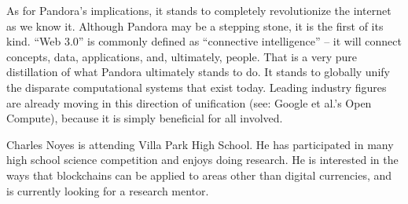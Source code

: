 \documentclass[journal]{IEEEtran}
\begin{document}
\par As for Pandora’s implications, it stands to completely revolutionize the internet as we know it. Although Pandora may be a stepping stone, it is the first of its kind. “Web 3.0” is commonly defined as “connective intelligence” – it will connect concepts, data, applications, and, ultimately, people. That is a very pure distillation of what Pandora ultimately stands to do. It stands to globally unify the disparate computational systems that exist today. Leading industry figures are already moving in this direction of unification (see: Google et al.’s Open Compute), because it is simply beneficial for all involved.



\begin{IEEEbiographynophoto}{Charles Noyes}
is  attending Villa Park High School. He has participated in many high school science competition and enjoys doing research. He is interested in the ways that blockchains can be applied to areas other than digital currencies, and is currently looking for a research mentor.
\end{IEEEbiographynophoto}



\end{document}
